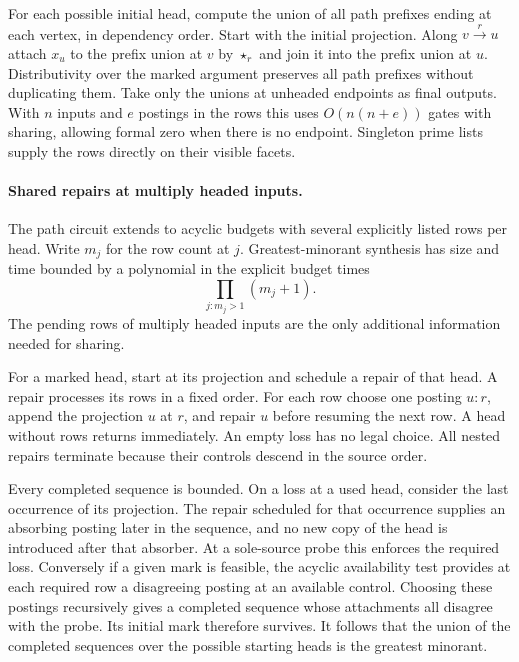 For each possible initial head, compute the
union of all path prefixes ending at each
vertex, in dependency order. Start with the
initial projection. Along $v\xrightarrow{r}u$
attach $x_u$ to the prefix union at $v$ by
$\star_r$ and join it into the prefix union
at $u$. Distributivity over the marked
argument preserves all path prefixes without
duplicating them. Take only the unions at
unheaded endpoints as final outputs. With
$n$ inputs and $e$ postings in the rows this
uses $O(n(n+e))$ gates with sharing, allowing
formal zero when there is no endpoint.
Singleton prime lists supply the rows
directly on their visible facets.

\paragraph{Shared repairs at multiply headed inputs.}
The path circuit extends to acyclic budgets with
several explicitly listed rows per head. Write $m_j$
for the row count at $j$. Greatest-minorant synthesis
has size and time bounded by a polynomial in the
explicit budget times
\[
                    \prod_{j:m_j>1}(m_j+1).
\]
The pending rows of multiply headed inputs are the
only additional information needed for sharing.

For a marked head, start at its projection and
schedule a repair of that head. A repair processes
its rows in a fixed order. For each row choose
one posting $u{:}r$, append the projection $u$
at $r$, and repair $u$ before resuming the next
row. A head without rows returns immediately.
An empty loss has no legal choice. All nested
repairs terminate because their controls descend
in the source order.

Every completed sequence is bounded. On a loss
at a used head, consider the last occurrence of
its projection. The repair scheduled for that
occurrence supplies an absorbing posting later
in the sequence, and no new copy of the head is
introduced after that absorber. At a sole-source
probe this enforces the required loss. Conversely
if a given mark is feasible, the acyclic availability
test provides at each required row a disagreeing
posting at an available control. Choosing these
postings recursively gives a completed sequence
whose attachments all disagree with the probe.
Its initial mark therefore survives. It follows
that the union of the completed sequences over
the possible starting heads is the greatest
minorant.

